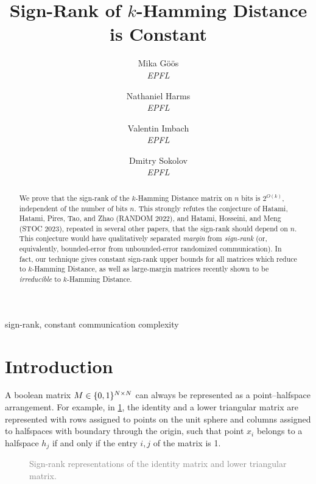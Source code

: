 \documentclass[conference]{IEEEtran}
\begin{document}
\title{Sign-Rank of $k$-Hamming Distance is Constant}

\author{
Mika G\"o\"os \\ {\slshape\normalsize EPFL}
\and
Nathaniel Harms \\ {\slshape\normalsize EPFL}
\and
Valentin Imbach \\ {\slshape\normalsize EPFL}
\and
Dmitry Sokolov \\ {\slshape\normalsize EPFL}
}

\maketitle

\begin{abstract}
We prove that the sign-rank of the $k$-Hamming Distance matrix on $n$ bits is
$2^{O(k)}$, independent of the number of bits $n$. This strongly refutes the
conjecture of Hatami, Hatami, Pires, Tao, and Zhao ({\footnotesize RANDOM
2022}), and Hatami, Hosseini, and Meng ({\footnotesize STOC 2023}), repeated in
several other papers, that the sign-rank should depend on $n$.
This conjecture
would have qualitatively separated \emph{margin} from \emph{sign-rank} (or,
equivalently, bounded-error from unbounded-error randomized communication). In
fact, our technique gives constant sign-rank upper bounds for all matrices which
reduce to $k$-Hamming Distance, as well as large-margin matrices recently shown
to be \emph{irreducible} to $k$-Hamming Distance.
\end{abstract}

\begin{IEEEkeywords}
sign-rank, constant communication complexity
\end{IEEEkeywords}

\section{Introduction}

A boolean matrix $M \in \{0,1\}^{N \times N}$ can always be represented as a
point--halfspace arrangement. For example, in \cref{fig:identity}, the identity
and a lower triangular
matrix are represented with rows assigned to points
on the unit sphere and columns assigned to halfspaces with boundary through the
origin, such that point $x_i$ belongs to a halfspace $h_j$ if and only if the entry
$i,j$ of the matrix is 1.
\begin{figure}[h!]
    \begin{center}
    \scalebox{0.8}{
        
        }
    \end{center}
    \caption{\textcolor{Gray}{
            Sign-rank representations of the identity matrix and lower triangular matrix.
        }
    }
    \label{fig:identity}
\end{figure}
\end{document}
